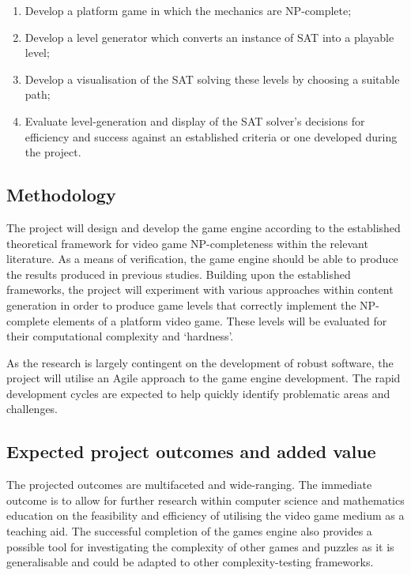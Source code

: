 \documentclass[a4paper]{article}
\begin{document}
\begin{enumerate}

  \item Develop a platform game in which the mechanics are NP-complete; \vspace{-3mm}  
  \item Develop a level generator which converts an instance of SAT into a playable level; \vspace{-3mm}        
  \item Develop a visualisation of the SAT solving these levels by choosing a suitable path;   \vspace{-3mm}
  \item Evaluate level-generation and display of the SAT solver's decisions for efficiency and success against an 
        established criteria or one developed during the project. \vspace{-3mm}

\end{enumerate}

\subsection{Methodology}

The project will design and develop the game engine according to the established theoretical
framework for video game NP-completeness within the relevant literature. As a means of verification,
the game engine should be able to produce the results produced in previous studies. Building upon
the established frameworks, the project will experiment with various approaches within content
generation in order to produce game levels that correctly implement the NP-complete elements of a
platform video game. These levels will be evaluated for their computational complexity and
`hardness'. 

As the research is largely contingent on the development of robust software, the project will
utilise an Agile approach to the game engine development. The rapid development cycles are expected
to help quickly identify problematic areas and challenges.

\subsection{Expected project outcomes and added value}

The projected outcomes are multifaceted and wide-ranging. The immediate outcome is to allow
for further research within computer science and mathematics education on the feasibility and
efficiency of utilising the video game medium as a teaching aid. The successful completion of the
games engine also provides a possible tool for investigating the complexity of other games and
puzzles as it is generalisable and could be adapted to other complexity-testing frameworks. 
\end{document}
